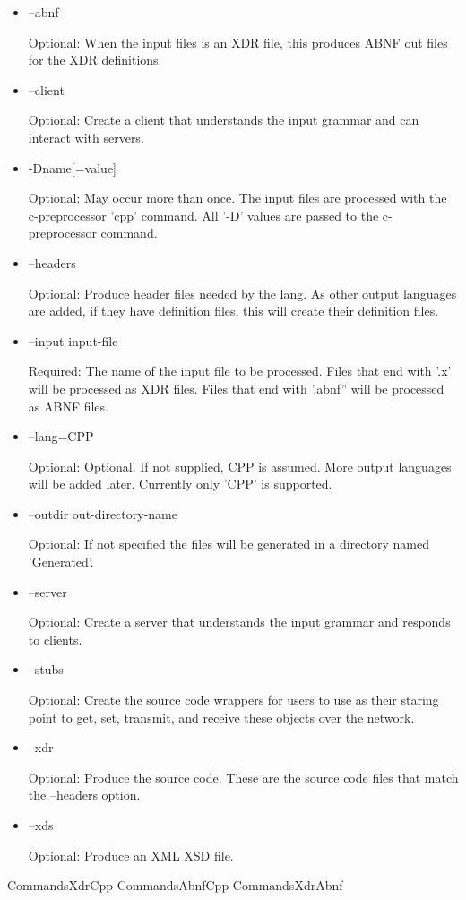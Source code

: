 \begin{itemize}

\item --abnf

  Optional: When the input files is an XDR file,
  this produces ABNF out files for the XDR definitions.
  
\item --client

  Optional: Create a client that understands the input grammar
  and can interact with servers.
  
\item -Dname[=value]

  Optional: May occur more than once.
  The input files are processed with the c-preprocessor 'cpp'
  command. All '-D' values are passed to the c-preprocessor command.
  
\item --headers

  Optional: Produce header files needed by the lang.
  As other output languages are added, if they have definition
  files, this will create their definition files.
  
\item --input input-file
  
  Required: The name of the input file to be processed.
  Files that end with '.x' will be processed as XDR files.
  Files that end with '.abnf'' will be processed as ABNF files.
  
\item --lang=CPP
  
  Optional: Optional. If not supplied, CPP is assumed.
  More output languages will be added later.
  Currently only 'CPP' is supported.
  
\item --outdir out-directory-name
  
  Optional: If not specified the files will be generated
  in a directory named 'Generated'.
  
\item --server

  Optional: Create a server that understands the input grammar
  and responds to clients.
  
\item --stubs

  Optional: Create the source code wrappers for users to
  use as their staring point to get, set, transmit, and
  receive these objects over the network.
  
\item --xdr

  Optional: Produce the source code. These are the source
  code files that match the --headers option.
  
\item --xds

  Optional: Produce an XML XSD file.
  
\end{itemize}

 {CommandsXdrCpp}
 {CommandsAbnfCpp}
 {CommandsXdrAbnf}
